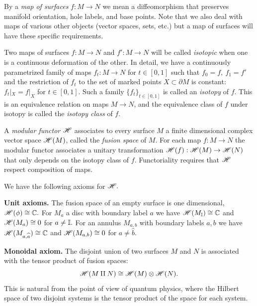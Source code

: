 \documentclass[aps, prl, letterpaper, twocolumn, superscriptaddress, notitlepage, 10pt]{revtex4-1}
\begin{document}
By a \emph{map of surfaces} $f:M\to N$ we mean 
a diffeomorphism that preserves
manifold orientation, hole labels, and base points.
Note that we also deal with maps of various other objects
(vector spaces, sets, etc.)
but a map of surfaces will have these specific
requirements.

Two maps of surfaces $f:M\to N$ and $f':M\to N$
will be called \emph{isotopic}
when one is a continuous deformation of the other.
In detail,
we have a continuously
parametrized family of maps $f_t:M\to N$ for $t\in [0, 1]$
such that $f_0=f,\ f_1=f'$
and the restriction of $f_t$ to the 
set of marked points $X\subset\partial M$ is constant:
$f_t|_{X} = f|_{X}$ for $t\in [0, 1].$
Such a family $\{f_t\}_{t\in [0,1]}$ is called an \emph{isotopy}
of $f.$
This is an equivalence relation on maps $M\to N$, and the equivalence
class of $f$ under isotopy is called the \emph{isotopy class} of $f.$

A \emph{modular functor} $\mathscr{H}$ associates to every
surface $M$ a finite dimensional complex
vector space $\mathscr{H}(M)$, called the \emph{fusion space} of $M$.
For each map $f:M\to N$
the modular functor associates a
unitary transformation $\mathscr{H}(f) : \mathscr{H}(M)\to\mathscr{H}(N)$
that only depends on the isotopy class of $f.$
Functoriality requires that $\mathscr{H}$
respect composition of maps.

We have the following axioms for $\mathscr{H}.$

{\bf Unit axioms.}
The fusion space of an empty surface is one dimensional, 
$\mathscr{H}(\phi) \cong \mathbb{C}.$ %
For $M_a$ a disc with boundary label $a$ we have
$\mathscr{H}(M_{\mathbb{I}})\cong \mathbb{C}$ and 
$\mathscr{H}(M_a)\cong 0$ for $a\ne \mathbb{I}.$
For an annulus $M_{a,b}$ with boundary labels
$a, b$ we have
$\mathscr{H}(M_{a,\widehat{a}})\cong \mathbb{C}$ and 
$\mathscr{H}(M_{a,b})\cong 0$ for $a\ne \widehat{b}.$

{\bf Monoidal axiom.}
The disjoint union of two surfaces $M$ and $N$ 
is associated with
the tensor product of fusion spaces:
$$
    \mathscr{H}(M\amalg N) \cong \mathscr{H}(M)\otimes \mathscr{H}(N).
$$
This is natural from the point of view of quantum
physics, where the Hilbert space of two disjoint
systems is the tensor product of the space for
each system.
\end{document}
